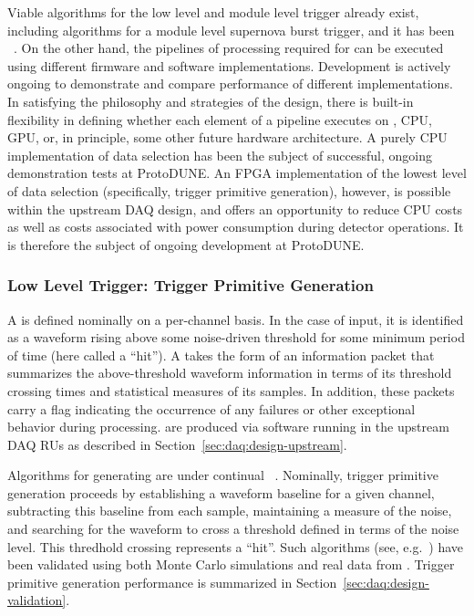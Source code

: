 Viable algorithms for the low level and module level trigger already exist,
including algorithms for a module level supernova burst trigger, and it has been
~\cite{xx}.
On the other hand, the pipelines of processing required for  can
be executed using different firmware and software implementations.
Development is actively ongoing to demonstrate and compare performance of
different implementations.
In satisfying the philosophy and strategies of the  design, there is
built-in flexibility in defining whether each element of a pipeline executes on
, CPU, GPU, or, in principle, some other future hardware architecture.
A purely CPU implementation of data selection has been the subject of
successful, ongoing demonstration tests at ProtoDUNE.
An FPGA implementation of the lowest level of data selection (specifically,
trigger primitive generation), however, is possible within the upstream DAQ
design, and offers an opportunity to reduce CPU costs as well as costs
associated with power consumption during detector operations.
It is therefore the subject of ongoing development at ProtoDUNE.

\subsubsection{Low Level Trigger: Trigger Primitive Generation}
\label{sec:daq:design-trigger-primitives}

A  is defined nominally on a per-channel basis.
In the case of  input, it is identified as a waveform rising above
some noise-driven threshold for some minimum period of time (here called a
``hit'').
A  takes the form of an information packet that summarizes
the above-threshold waveform information in terms of its threshold crossing
times and statistical measures of its  samples. 
In addition, these packets carry a flag indicating the occurrence of any
failures or other exceptional behavior during  processing.
 are produced via software running in the upstream DAQ RUs
as described in Section~\ref{sec:daq:design-upstream}.

Algorithms for generating  are under continual
~\cite{docid-11275}.
Nominally, trigger primitive generation proceeds by establishing a waveform
baseline for a given channel, subtracting this baseline from each sample,
maintaining a measure of the noise, and searching for the waveform to cross a
threshold defined in terms of the noise level.
This thredhold crossing represents a ``hit''. 
Such algorithms (see, e.g.~\cite{docid-11236}) have been validated using both
Monte Carlo simulations and real data from . 
Trigger primitive generation performance is summarized in
Section~\ref{sec:daq:design-validation}.

